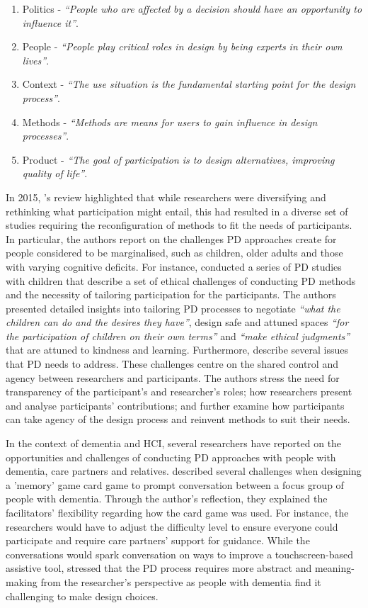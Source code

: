 \begin{enumerate}
\item Politics - \textit{``People who are affected by a decision should have an opportunity to influence it''}.
\item People - \textit{``People play critical roles in design by being experts in their own lives''}.
\item Context - \textit{``The use situation is the fundamental starting point for the design process''}.
\item Methods - \textit{``Methods are means for users to gain influence in design processes''}.
\item Product - \textit{``The goal of participation is to design alternatives, improving quality of life''}.
\end{enumerate}

In 2015, \citeauthor{halskov2015diversity}'s review highlighted that while researchers were diversifying and rethinking what participation might entail, this had resulted in a diverse set of studies requiring the reconfiguration of methods to fit the needs of participants. In particular, the authors report on the challenges PD approaches create for people considered to be marginalised, such as children, older adults and those with varying cognitive deficits. For instance, \cite{spiel2018micro} conducted a series of PD studies with children that describe a set of ethical challenges of conducting PD methods and the necessity of tailoring participation for the participants. The authors presented detailed insights into tailoring PD processes to negotiate \textit{``what the children can do and the desires they have''}, design safe and attuned spaces \textit{``for the participation of children on their own terms''} and \textit{``make ethical judgments''} that are attuned to kindness and learning. Furthermore, \cite{vines_configuring_2013} describe several issues that PD needs to address. These challenges centre on the shared control and agency between researchers and participants. The authors stress the need for transparency of the participant's and researcher's roles; how researchers present and analyse participants' contributions; and further examine how participants can take agency of the design process and reinvent methods to suit their needs.

In the context of dementia and HCI, several researchers have reported on the opportunities and challenges of conducting PD approaches with people with dementia, care partners and relatives. \cite{mayer2013lessons} described several challenges when designing a 'memory' game card game to prompt conversation between a focus group of people with dementia. Through the author's reflection, they explained the facilitators' flexibility regarding how the card game was used. For instance, the researchers would have to adjust the difficulty level to ensure everyone could participate and require care partners' support for guidance. While the conversations would spark conversation on ways to improve a touchscreen-based assistive tool, \cite{mayer2013lessons} stressed that the PD process requires more abstract and meaning-making from the researcher's perspective as people with dementia find it challenging to make design choices.

